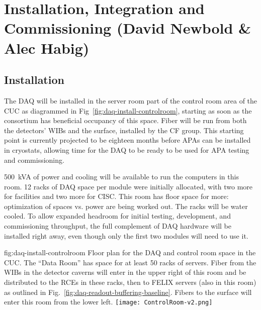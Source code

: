
\section{Installation, Integration and Commissioning (David Newbold \& Alec Habig)}
\label{sec:fdsp-daq-install}


\subsection{Installation}
\label{sec:fdsp-daq-install-transport}

The DAQ will be installed in the server room part of the control room
area of the CUC as diagrammed in Fig~\ref{fig:daq-install-controlroom},
starting as soon as the consortium has beneficial occupancy of this
space.  Fiber will be run from both the detectors' WIBs and the surface,
installed by the CF group.  This starting point is currently projected
to be eighteen months before APAs can be installed in cryostats,
allowing time for the DAQ to be ready to be used for APA testing and
commissioning.

\SI{500}{kVA} of power and cooling will be available to run the
computers in this room.  12 racks of DAQ space per module were initially
allocated, with two more for facilities and two more for CISC.  This
room has floor space for more: optimization of spaces vs. power are being
worked out.  The racks will be water cooled. To allow expanded headroom
for initial testing, development, and commissioning throughput, the
full complement of DAQ hardware will be installed right away, even
though only the first two modules will need to use it.

\begin{dunefigure}{fig:daq-install-controlroom}
  {Floor plan for the DAQ and control room space in the CUC.  The ``Data
    Room'' has space for at least 50 racks of servers.  Fiber from the
    WIBs in the detector caverns will enter in the upper right of this
    room and be distributed to the RCEs in these racks, then to FELIX
    servers (also in this room) as outlined in
    Fig.~\ref{fig:daq-readout-buffering-baseline}.  Fibers to the surface
    will enter this room from the lower left.}
\texttt{[image: ControlRoom-v2.png]}
\end{dunefigure}

